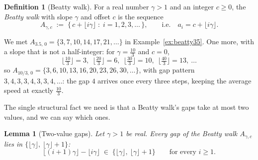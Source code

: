 \documentclass[11pt,reqno]{amsart}
\theoremstyle{plain}
\newtheorem{lemma}[theorem]{Lemma}
\theoremstyle{definition}
\newtheorem{definition}[theorem]{Definition}
\theoremstyle{remark}
\begin{document}
\begin{definition}[Beatty walk]\label{def:beatty-walk}
For a real number $\gamma > 1$ and an integer $c \ge 0$, the \emph{Beatty walk} with
slope $\gamma$ and offset $c$ is the sequence
\[
  A_{\gamma,c} \;:=\; \{\, c + \lfloor i \gamma \rfloor \;:\; i = 1, 2, 3, \dots \,\},
  \qquad \text{i.e.} \quad a_i = c + \lfloor i\gamma \rfloor .
\]
\end{definition}

We met $A_{3.5,\,0} = \{3, 7, 10, 14, 17, 21, \dots\}$ in
Example~\ref{ex:beatty35}. One more, with a slope that is not a half-integer: for
$\gamma = \tfrac{10}{3}$ and $c = 0$,
\[
  \lfloor \tfrac{10}{3} \rfloor = 3,\ \
  \lfloor \tfrac{20}{3} \rfloor = 6,\ \
  \lfloor \tfrac{30}{3} \rfloor = 10,\ \
  \lfloor \tfrac{40}{3} \rfloor = 13,\ \dots
\]
so $A_{10/3,\,0} = \{3, 6, 10, 13, 16, 20, 23, 26, 30, \dots\}$, with gap pattern
$3, 4, 3, 3, 4, 3, 3, 4, \dots$: the gap $4$ arrives once every three steps, keeping
the average speed at exactly $\tfrac{10}{3}$.

The single structural fact we need is that a Beatty walk's gaps take at most two
values, and we can say which ones.

\begin{lemma}[Two-value gaps]\label{lem:two-gaps}
Let $\gamma > 1$ be real. Every gap of the Beatty walk $A_{\gamma,c}$ lies in
$\{\lfloor \gamma \rfloor,\ \lfloor \gamma \rfloor + 1\}$:
\[
  \lfloor (i+1)\gamma \rfloor - \lfloor i\gamma \rfloor
  \;\in\; \{\lfloor \gamma \rfloor,\ \lfloor \gamma \rfloor + 1\}
  \qquad \text{for every } i \ge 1 .
\]
\end{lemma}
\end{document}
